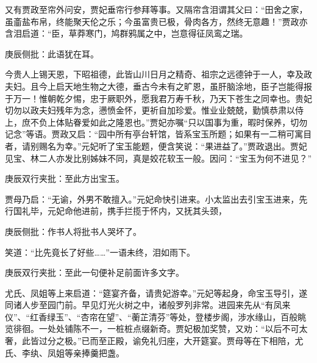 \begin{parag}
    又有贾政至帘外问安，贾妃垂帘行参拜等事。又隔帘含泪谓其父曰：“田舍之家，虽齑盐布帛，终能聚天伦之乐；今虽富贵已极，骨肉各方，然终无意趣！”贾政亦含泪启道：“臣，草莽寒门，鸠群鸦属之中，岂意得征凤鸾之瑞。\begin{note}庚辰侧批：此语犹在耳。\end{note}今贵人上锡天恩，下昭祖德，此皆山川日月之精奇、祖宗之远德钟于一人，幸及政夫妇。且今上启天地生物之大德，垂古今未有之旷恩，虽肝脑涂地，臣子岂能得报于万一！惟朝乾夕惕，忠于厥职外，愿我君万寿千秋，乃天下苍生之同幸也。贵妃切勿以政夫妇残年为念，懑愤金怀，更祈自加珍爱。惟业业兢兢，勤慎恭肃以侍上，庶不负上体贴眷爱如此之隆恩也。”贾妃亦嘱“只以国事为重，暇时保养，切勿记念”等语。贾政又启：“园中所有亭台轩馆，皆系宝玉所题；如果有一二稍可寓目者，请别赐名为幸。”元妃听了宝玉能题，便含笑说：“果进益了。”贾政退出。贾妃见宝、林二人亦发比别姊妹不同，真是姣花软玉一般。因问：“宝玉为何不进见？”\begin{note}庚辰双行夹批：至此方出宝玉。\end{note}贾母乃启：“无谕，外男不敢擅入。”元妃命快引进来。小太监出去引宝玉进来，先行国礼毕，元妃命他进前，携手拦揽于怀内，又抚其头颈，\begin{note}庚辰侧批：作书人将批书人哭坏了。\end{note}笑道：“比先竟长了好些……”一语未终，泪如雨下。\begin{note}庚辰双行夹批：至此一句便补足前面许多文字。\end{note}
\end{parag}


\begin{parag}
    尤氏、凤姐等上来启道：“筵宴齐备，请贵妃游幸。”元妃等起身，命宝玉导引，遂同诸人步至园门前。早见灯光火树之中，诸般罗列非常。进园来先从“有凤来仪”、“红香绿玉”、“杏帘在望”、“蘅芷清芬”等处，登楼步阁，涉水缘山，百般眺览徘徊。一处处铺陈不一，一桩桩点缀新奇。贾妃极加奖赞，又劝：“以后不可太奢，此皆过分之极。”已而至正殿，谕免礼归座，大开筵宴。贾母等在下相陪，尤氏、李纨、凤姐等亲捧羹把盏。
\end{parag}


